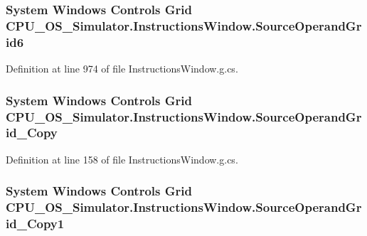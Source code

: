 \subsubsection[{Source\+Operand\+Grid6}]{\setlength{\rightskip}{0pt plus 5cm}System Windows Controls Grid C\+P\+U\+\_\+\+O\+S\+\_\+\+Simulator.\+Instructions\+Window.\+Source\+Operand\+Grid6\hspace{0.3cm}{\ttfamily [package]}}\label{class_c_p_u___o_s___simulator_1_1_instructions_window_a1036ae92003998bc7e7062a73358adec}


Definition at line 974 of file Instructions\+Window.\+g.\+cs.

\hypertarget{class_c_p_u___o_s___simulator_1_1_instructions_window_a46fbe457dccbe131387644a73cc19b19}{}
\subsubsection[{Source\+Operand\+Grid\+\_\+\+Copy}]{\setlength{\rightskip}{0pt plus 5cm}System Windows Controls Grid C\+P\+U\+\_\+\+O\+S\+\_\+\+Simulator.\+Instructions\+Window.\+Source\+Operand\+Grid\+\_\+\+Copy\hspace{0.3cm}{\ttfamily [package]}}\label{class_c_p_u___o_s___simulator_1_1_instructions_window_a46fbe457dccbe131387644a73cc19b19}


Definition at line 158 of file Instructions\+Window.\+g.\+cs.

\hypertarget{class_c_p_u___o_s___simulator_1_1_instructions_window_a685393ff28189e8c998e2a7dc6018b32}{}
\subsubsection[{Source\+Operand\+Grid\+\_\+\+Copy1}]{\setlength{\rightskip}{0pt plus 5cm}System Windows Controls Grid C\+P\+U\+\_\+\+O\+S\+\_\+\+Simulator.\+Instructions\+Window.\+Source\+Operand\+Grid\+\_\+\+Copy1\hspace{0.3cm}{\ttfamily [package]}}\label{class_c_p_u___o_s___simulator_1_1_instructions_window_a685393ff28189e8c998e2a7dc6018b32}


